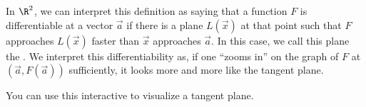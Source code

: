 \documentclass{ximera}
\begin{document}
%
%
%
%
%



In $\R^2$, we can interpret this definition as saying that a function
$F$ is differentiable at a vector $\vec{a}$ if there is a plane
$L(\vec{x})$ at that point such that $F$ approaches
$L(\vec{x})$ faster than $\vec{x}$ approaches $\vec{a}$.  In
this case, we call this plane the .  We interpret
this differentiability as, if one ``zooms in'' on the graph of $F$ at
$(\vec{a}, F(\vec{a}))$ sufficiently, it looks more and more like the
tangent plane.

\begin{onlineOnly}
  You can use this interactive to visualize a tangent plane.
  \begin{center}
  \end{center}
\end{onlineOnly}
\end{document}
